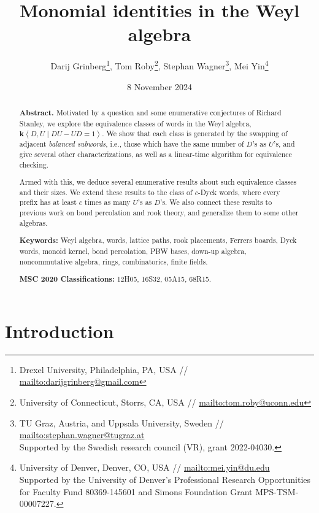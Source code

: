 \documentclass[numbers=enddot,12pt,final,onecolumn,notitlepage]{scrartcl}%
\theoremstyle{definition}
\begin{document}
\title{Monomial identities in the Weyl algebra}
\author{Darij Grinberg\footnote{Drexel University, Philadelphia, PA, USA // \url{mailto:darijgrinberg@gmail.com}}, Tom Roby\footnote{University of Connecticut, Storrs, CA, USA // \url{mailto:tom.roby@uconn.edu}}, Stephan Wagner\footnote{TU Graz, Austria, and Uppsala University, Sweden // \url{mailto:stephan.wagner@tugraz.at} \\ Supported by the Swedish research council (VR), grant 2022-04030.}, Mei Yin\footnote{University of Denver, Denver, CO, USA // \url{mailto:mei.yin@du.edu} \\ Supported by the University of Denver's Professional Research Opportunities for Faculty Fund 80369-145601 and Simons Foundation Grant MPS-TSM-00007227.}}
\date{8 November 2024}
\dedication{\textit{Dedicated to a Hip Trendy Rascal on his 80th birthday}}
\maketitle

\begin{abstract}
\textbf{Abstract.}
Motivated by a question and some enumerative conjectures of Richard Stanley, we explore the
equivalence classes of words in the Weyl algebra, $\mathbf{k} \left< D,U \mid DU - UD = 1 \right>$.  We show that each class is generated by the swapping of adjacent \textit{balanced subwords}, i.e., those
which have the same number of $D$'s as $U$'s, and give several other characterizations, as well as a linear-time algorithm for equivalence checking.

Armed with this, we deduce several enumerative results about such equivalence classes and their sizes.
We extend these results to the class of $c$-Dyck words, where every prefix has at least $c$ times as many $U$'s as $D$'s.  
We also connect these results to previous work on bond
percolation and rook theory, and generalize them to some other algebras. 
\medskip

\textbf{Keywords:}
Weyl algebra, words, lattice paths, rook placements, Ferrers boards, Dyck words, monoid kernel, bond percolation, PBW bases, down-up algebra, noncommutative algebra, rings, combinatorics, finite fields.
\medskip

\textbf{MSC 2020 Classifications:}
12H05, 16S32, 05A15, 68R15.
\end{abstract}

\tableofcontents

\section{Introduction}\label{sec:intro}
\end{document}
